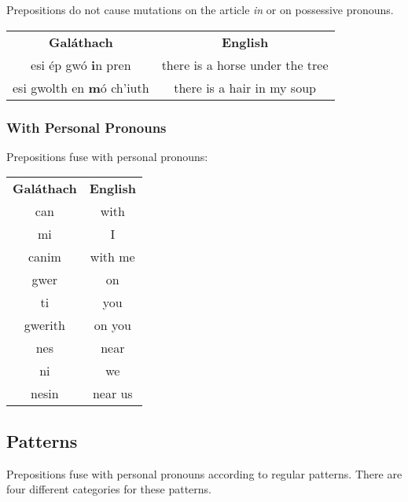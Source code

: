Prepositions do not cause mutations on the article \textit{in} or on possessive pronouns.
\begin{table}[H]
\centering
\begin{tabular}{cc}
  \toprule
  \textbf{Gal\'{a}thach} & \textbf{English}\\
  \cmidrule(lr){1-1}\cmidrule(lr){2-2}
  esi \'{e}p gw\'{o} \textbf{i}n pren & there is a horse under the tree\\
  esi gwolth en \textbf{m}\'{o} ch'iuth & there is a hair in my soup\\
  \bottomrule
\end{tabular}
\label{examples_prepositions_no_mutation_on_in}
\end{table}

\subsubsection{With Personal Pronouns}

Prepositions fuse with personal pronouns:
\begin{table}[H]
\centering
\begin{tabular}{cc}
  \toprule
  \textbf{Gal\'{a}thach} & \textbf{English}\\
  \cmidrule(lr){1-1}\cmidrule(lr){2-2}
  can & with\\
  mi & I\\
  canim & with me\\
  \cmidrule(lr){1-1}\cmidrule(lr){2-2}
  gwer & on\\
  ti & you\\
  gwerith & on you\\
  \cmidrule(lr){1-1}\cmidrule(lr){2-2}
  nes & near\\
  ni & we\\
  nesin & near us\\
  \bottomrule
\end{tabular}
\label{examples_prepositions_fusing}
\end{table}

\subsection{Patterns}

Prepositions fuse with personal pronouns according to regular patterns. There are four different categories for these patterns.

